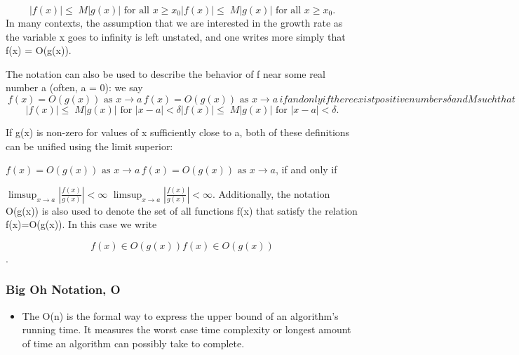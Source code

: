 \documentclass{beamer}
\begin{document}
\begin{frame}
\[{\displaystyle |f(x)|\leq \;M|g(x)|{\text{ for all }}x\geq x_{0}} {\displaystyle |f(x)|\leq \;M|g(x)|{\text{ for all }}x\geq x_{0}}.\]
In many contexts, the assumption that we are interested in the growth rate as the variable x goes to infinity is left unstated, and one writes more simply that f(x) = O(g(x)).
\end{frame}
\begin{frame}

The notation can also be used to describe the behavior of f near some real number a (often, a = 0): we say
\[\
{\displaystyle f(x)=O(g(x)){\text{ as }}x\to a\,} f(x)=O(g(x)){\text{ as }}x\to a\,
if and only if there exist positive numbers δ and M such that
\]
\[
{\displaystyle |f(x)|\leq \;M|g(x)|{\text{ for }}|x-a|<\delta } {\displaystyle |f(x)|\leq \;M|g(x)|{\text{ for }}|x-a|<\delta }.
\]
\end{frame}
\begin{frame}
If g(x) is non-zero for values of x sufficiently close to a, both of these definitions can be unified using the limit superior:

${\displaystyle f(x)=O(g(x)){\text{ as }}x\to a\,} f(x)=O(g(x)){\text{ as }}x\to a $,
if and only if

${\displaystyle \limsup _{x\to a}\left|{\frac {f(x)}{g(x)}}\right|<\infty }$ ${\displaystyle \limsup _{x\to a}\left|{\frac {f(x)}{g(x)}}\right|<\infty }$.
Additionally, the notation O(g(x)) is also used to denote the set of all functions f(x) that satisfy the relation f(x)=O(g(x)). In this case we write

\[{\displaystyle f(x)\in O(g(x))} f(x)\in O(g(x))\].
\end{frame}
\begin{frame}
\frametitle{Big Oh Notation, Ο}
\begin{itemize}
\item The Ο(n) is the formal way to express the upper bound of an algorithm's running time. It measures the worst case time complexity or longest amount of time an algorithm can possibly take to complete.
\end{itemize}
\end{frame}
\end{document}

